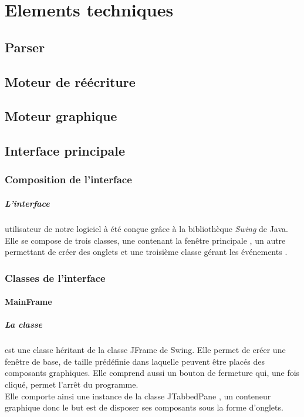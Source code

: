 \chapter{Elements techniques}

\section{Parser}\label{sec:parser}

\section{Moteur de réécriture}

\section{Moteur graphique}\label{src:interface3d}

\section{Interface principale}\label{sec:menu}

\subsection{Composition de l'interface}

\paragraph{L'interface}
 utilisateur de notre logiciel à été conçue grâce à la bibliothèque \textit{Swing} de Java. Elle se compose de trois classes, une contenant la fenêtre principale , un autre permettant de créer des onglets  et une troisième classe gérant les événements .
 
\subsection{Classes de l'interface}

\subsubsection{MainFrame}

\paragraph{La classe } est une classe héritant de la classe JFrame de Swing. Elle permet de créer une fenêtre de base, de taille prédéfinie dans laquelle peuvent être placés des composants graphiques. Elle comprend aussi un bouton de fermeture qui, une fois cliqué, permet l'arrêt du programme.\\
Elle comporte ainsi une instance de la classe JTabbedPane \label{jtpane}, un conteneur graphique donc le but est de disposer ses composants sous la forme d'onglets.

